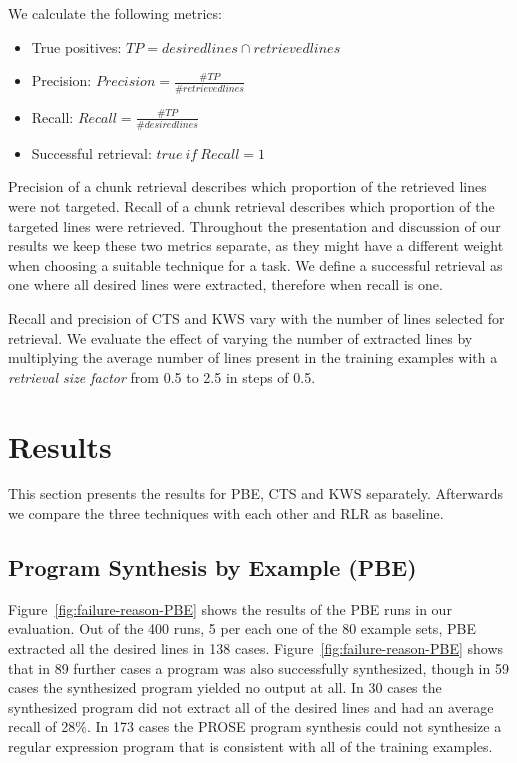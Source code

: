\documentclass[\myrootdir/main.tex]{subfiles}
\begin{document}
We calculate the following metrics:
\begin{itemize}
	\item True positives: $TP = desiredlines \cap retrievedlines$
	\item Precision: $Precision =  \frac{\# TP}{\# retrievedlines}$
	\item Recall: $Recall = \frac{\# TP}{\# desiredlines}$
	\item Successful retrieval: $true\ if\ Recall = 1$
\end{itemize}

Precision of a chunk retrieval describes which proportion of the retrieved lines were not targeted.
Recall of a chunk retrieval describes which proportion of the targeted lines were retrieved.
Throughout the presentation and discussion of our results we keep these two metrics separate, as they might have a different weight when choosing a suitable technique for a task.
We define a successful retrieval as one where all desired lines were extracted, therefore when recall is one.

Recall and precision of CTS and KWS vary with the number of lines selected for retrieval.
We evaluate the effect of varying the number of extracted lines by multiplying the average number of lines present in the training examples with a \emph{retrieval size factor} from 0.5 to 2.5 in steps of 0.5.

\section{Results}
This section presents the results for PBE, CTS and KWS separately.
Afterwards we compare the three techniques with each other and RLR as baseline.

\subsection{Program Synthesis by Example (PBE)}
Figure~\ref{fig:failure-reason-PBE} shows the results of the PBE runs in our evaluation.
Out of the 400 runs, 5 per each one of the 80 example sets, PBE extracted all the desired lines in 138 cases.
Figure~\ref{fig:failure-reason-PBE} shows that in 89 further cases a program was also successfully synthesized, though in 59 cases the synthesized program yielded no output at all.
In 30 cases the synthesized program did not extract all of the desired lines and had an average recall of 28\%.
In 173 cases the PROSE program synthesis could not synthesize a regular expression program that is consistent with all of the training examples.
\end{document}
